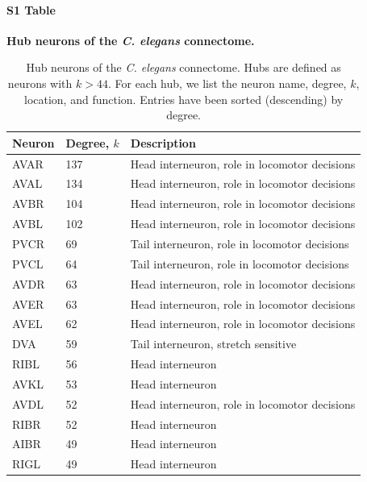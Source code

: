 \documentclass[10pt,letterpaper]{article}
\begin{document}
{%

\paragraph*{S1 Table}
{\bf Hub neurons of the \textit{C. elegans} connectome.}
\begin{table}[h]
\centering
\caption{Hub neurons of the \textit{C. elegans} connectome.
Hubs are defined as neurons with $k>44$.
For each hub, we list the neuron name, degree, $k$, location, and function.
Entries have been sorted (descending) by degree.}
\label{tab:HubList}
\begin{tabular}{lll}
\hline
\textbf{Neuron} & \textbf{Degree, $k$} & \textbf{Description}                    \\ \hline
AVAR   & 137        & Head interneuron, role in locomotor decisions                \\
AVAL   & 134        & Head interneuron, role in locomotor decisions                \\
AVBR   & 104        & Head interneuron, role in locomotor decisions                \\
AVBL   & 102        & Head interneuron, role in locomotor decisions                \\
PVCR   & 69         & Tail interneuron, role in locomotor decisions                \\
PVCL   & 64         & Tail interneuron, role in locomotor decisions                \\
AVDR   & 63         & Head interneuron, role in locomotor decisions 				\\
AVER   & 63         & Head interneuron, role in locomotor decisions                \\
AVEL   & 62         & Head interneuron, role in locomotor decisions                \\
DVA    & 59         & Tail interneuron, stretch sensitive                \\
RIBL   & 56         & Head interneuron                							\\
AVKL   & 53         & Head interneuron                                             \\
AVDL   & 52         & Head interneuron, role in locomotor decisions                 \\
RIBR   & 52         & Head interneuron                                             \\
AIBR   & 49         & Head interneuron                                             \\
RIGL   & 49         & Head interneuron                                             \\\hline
\end{tabular}
\end{table}


}
\end{document}
